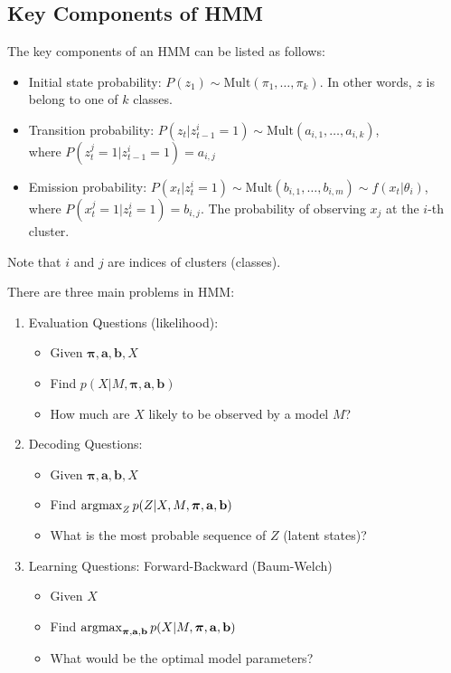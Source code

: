\subsection{Key Components of HMM}
The key components of an HMM can be listed as follows:
\begin{itemize}
	\item Initial state probability: $P(z_1)\sim \textrm{Mult}(\pi_1, \dots, \pi_k)$. In other words, $z$ is belong to one of $k$ classes. 
	\item Transition probability: $P(z_t|z^i_{t-1}=1)\sim \textrm{Mult}(a_{i,1}, \dots, a_{i,k})$, \\ where $P(z_t^j=1|z_{t-1}^i=1) = a_{i,j}$
	\item Emission probability: $P(x_t|z_t^i=1)\sim \textrm{Mult}(b_{i,1}, \dots, b_{i,m})\sim f(x_t|\theta_i)$,\\ where $P(x_t^j=1|z_{t}^i=1) = b_{i,j}$. The probability of observing $x_j$ at the  $i$-th cluster. 
\end{itemize}
Note that $i$ and $j$ are indices of clusters (\eg classes). 

There are three main problems in HMM:
\begin{enumerate}
	\item Evaluation Questions (likelihood): %
	\begin{itemize}
		\item Given $\boldsymbol{\pi}\mathbf{, a, b}, X$
		\item Find $p(X|M, \boldsymbol{\pi}\mathbf{, a, b})$
		\item How much are $X$ likely to be observed by a model $M$?
	\end{itemize}
	
	\item Decoding Questions:
	\begin{itemize}
		\item Given $\boldsymbol{\pi}\mathbf{, a, b}, X$
		\item Find $\operatorname*{\operatorname{argmax}}_Z p(Z|X, M, \boldsymbol{\pi}\mathbf{, a, b})$
		\item What is the most probable sequence of $Z$ (latent states)? 
	\end{itemize}
	
	\item Learning Questions: Forward-Backward (Baum-Welch)
	\begin{itemize}
		\item Given $X$
		\item Find $\operatorname*{\operatorname{argmax}}_{\boldsymbol{\pi}\mathbf{, a, b}} p(X|M, \boldsymbol{\pi}\mathbf{, a, b})$
		\item What would be the optimal model parameters? 
	\end{itemize}
\end{enumerate}


